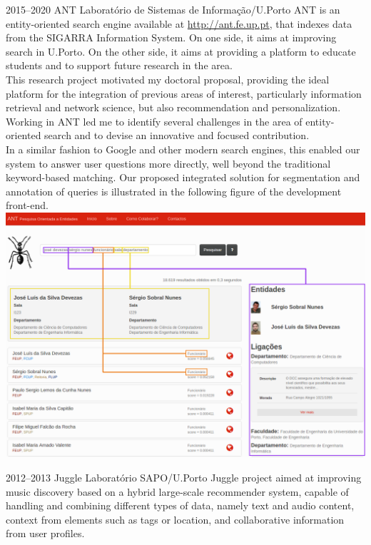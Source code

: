 \documentclass{friggeri-cv}
\begin{document}
\begin{entrylist}
\entry
{2015--2020}
{ANT}
{Laboratório de Sistemas de Informação/U.Porto}
{ANT is an entity-oriented search engine available at \url{http://ant.fe.up.pt}, that indexes data from the SIGARRA Information System. On one side, it aims at improving search in U.Porto. On the other side, it aims at providing a platform to educate students and to support future research in the area.\\

This research project motivated my doctoral proposal, providing the ideal platform for the integration of previous areas of interest, particularly information retrieval and network science, but also recommendation and personalization. Working in ANT led me to identify several challenges in the area of entity-oriented search and to devise an innovative and focused contribution.\\

In a similar fashion to Google and other modern search engines, this enabled our system to answer user questions more directly, well beyond the traditional keyword-based matching. Our proposed integrated solution for segmentation and annotation of queries is illustrated in the following figure of the development front-end.\\

\includegraphics[width=.85\columnwidth]{ant.png}\\}

\entry
{2012--2013}
{Juggle}
{Laboratório SAPO/U.Porto}
{Juggle project aimed at improving music discovery based on a hybrid large-scale recommender system, capable of handling and combining different types of data, namely text and audio content, context from elements such as tags or location, and collaborative information from user profiles.}
\end{entrylist}
\end{document}
